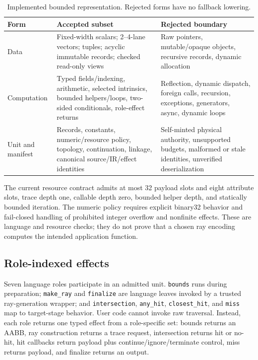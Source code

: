 \documentclass[sigplan,screen,review,anonymous]{acmart}
\begin{document}
\begin{table}[t]
  \caption{Implemented bounded representation. Rejected forms have no fallback
  lowering.}
  \label{tab:ir}
  \scriptsize
  \begin{tabularx}{\textwidth}{@{}p{}p{}X@{}}
    \toprule
    Form & Accepted subset & Rejected boundary \\
    \midrule
    Data & Fixed-width scalars; 2--4-lane vectors; tuples; acyclic immutable
    records; checked read-only views & Raw pointers, mutable/opaque objects,
    recursive records, dynamic allocation \\
    Computation & Typed fields/indexing, arithmetic, selected intrinsics,
    bounded helpers/loops, two-sided conditionals, role-effect returns &
    Reflection, dynamic dispatch, foreign calls, recursion, exceptions,
    generators, async, dynamic loops \\
    Unit and manifest & Records, constants, numeric/resource policy, topology,
    continuation, linkage, canonical source/IR/effect identities & Self-minted
    physical authority, unsupported budgets, malformed or stale identities,
    unverified deserialization \\
    \bottomrule
  \end{tabularx}
\end{table}

The current resource contract admits at most 32 payload slots and eight
attribute slots, trace depth one, callable depth zero, bounded helper depth, and
statically bounded iteration. The numeric policy requires explicit binary32
behavior and fail-closed handling of prohibited integer overflow and nonfinite
effects. These are language and resource checks; they do not prove that a
chosen ray encoding computes the intended application function.

\subsection{Role-indexed effects}

Seven language roles participate in an admitted unit. \texttt{bounds} runs
during preparation; \texttt{make\_ray} and \texttt{finalize} are language
leaves invoked by a trusted ray-generation wrapper; and \texttt{intersection},
\texttt{any\_hit}, \texttt{closest\_hit}, and \texttt{miss} map to target-stage
behavior. User code cannot invoke raw traversal. Instead, each role returns one
typed effect from a role-specific set: bounds returns an AABB, ray construction
returns a trace request, intersection returns hit or no-hit, hit callbacks
return payload plus continue/ignore/terminate control, miss returns payload,
and finalize returns an output.
\end{document}

